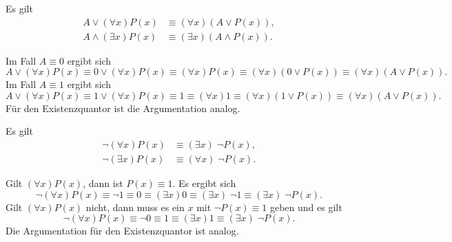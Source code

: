 \begin{Satz}
Es gilt
\begin{align*}
A\lor (\forall x)P(x) &\equiv (\forall x)(A\lor P(x)),\\
A\land(\exists x)P(x) &\equiv (\exists x)(A\land P(x)).
\end{align*}
\end{Satz}
 Im Fall $A\equiv 0$ ergibt sich
\[A\lor(\forall x)P(x) \equiv 0\lor(\forall x)P(x)
\equiv (\forall x)P(x)\equiv (\forall x)(0\lor P(x))\equiv (\forall x)(A\lor P(x)).\]
Im Fall $A\equiv 1$ ergibt sich
\[A\lor(\forall x)P(x)\equiv 1\lor(\forall x)P(x) \equiv 1 \equiv (\forall x)1
\equiv (\forall x)(1\lor P(x))\equiv (\forall x)(A\lor P(x)).\]
Für den Existenzquantor ist die Argumentation analog.\;\qedsymbol

\begin{Satz}
Es gilt
\begin{align*}
\neg (\forall x)P(x) &\equiv (\exists x)\;\neg P(x),\\
\neg (\exists x)P(x) &\equiv (\forall x)\;\neg P(x).
\end{align*}
\end{Satz}
 Gilt $(\forall x)P(x)$, dann ist $P(x)\equiv 1$.
Es ergibt sich
\begin{equation}
\neg(\forall x)P(x) \equiv \neg 1 \equiv 0 \equiv (\exists x)0
\equiv (\exists x)\;\neg 1\equiv (\exists x)\;\neg P(x).
\end{equation}
Gilt $(\forall x)P(x)$ nicht, dann muss es ein $x$ mit
$\neg P(x)\equiv 1$ geben und es gilt
\begin{equation}
\neg(\forall x)P(x) \equiv \neg 0\equiv 1\equiv (\exists x)1
\equiv (\exists x)\;\neg P(x).
\end{equation}
Die Argumentation für den Existenzquantor ist analog.\;\qedsymbol

